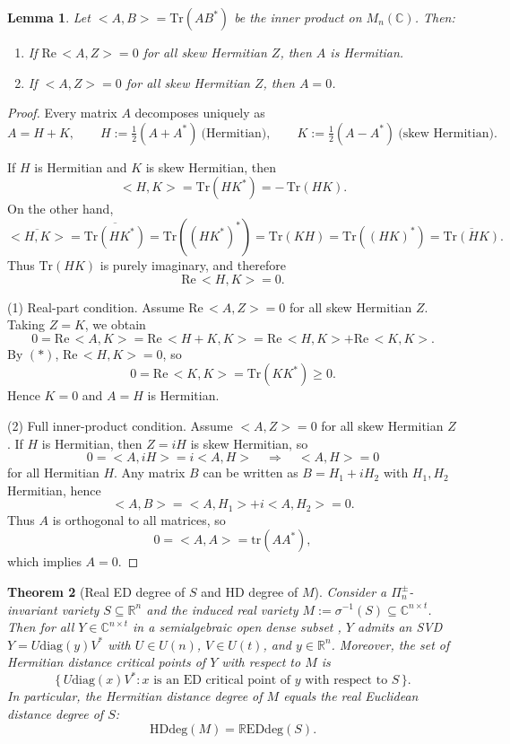 \documentclass[11pt]{amsart}
\def\C{\mathbb C}\let\ce\C
\theoremstyle{plain}
\newtheorem{theorem}{Theorem}
\newtheorem{lemma}[theorem]{Lemma}
\theoremstyle{definition}
\theoremstyle{remark}
\begin{document}
\begin{lemma} \label{skew}
Let $<A,B> = \mathrm{Tr}(A B^{*})$ be the inner product on 
$M_n(\mathbb{C})$. Then:
\begin{enumerate}
\item If $\mathrm{Re}\,<A,Z> = 0$ for all skew Hermitian $Z$, then $A$ is Hermitian.
\item If $<A,Z> = 0$ for all skew Hermitian $Z$, then $A = 0$.
\end{enumerate}
\end{lemma}
\begin{proof}
Every matrix $A$ decomposes uniquely as
\[
A = H + K, \qquad 
H := \tfrac12(A + A^{*})\ \text{(Hermitian)}, \qquad
K := \tfrac12(A - A^{*})\ \text{(skew Hermitian)}.
\]


If $H$ is Hermitian and $K$ is skew Hermitian, then
\[
<H,K> = \mathrm{Tr}(H K^{*}) = -\,\mathrm{Tr}(H K).
\]
On the other hand,
\[
\overline{<H,K>}
= \overline{\mathrm{Tr}(H K^{*})}
= \mathrm{Tr}((H K^{*})^{*})
= \mathrm{Tr}(K H)
= \mathrm{Tr}((H K)^{*})
= \overline{\mathrm{Tr}(H K)}.
\]
Thus $\mathrm{Tr}(H K)$ is purely imaginary, and therefore
\[
\mathrm{Re}\,<H,K> = 0. \tag{$*$}
\]

(1) Real-part condition.
Assume $\mathrm{Re}\,<A,Z> = 0$ for all skew Hermitian $Z$.
Taking $Z = K$, we obtain
\[
0 = \mathrm{Re}\,<A,K>
= \mathrm{Re}\,<H+K,K>
= \mathrm{Re}\,<H,K> + \mathrm{Re}\,<K,K>.
\]
By $(*)$, $\mathrm{Re}\,<H,K>=0$, so
\[
0 = \mathrm{Re}\,<K,K> = \mathrm{Tr}(K K^{*}) \ge 0.
\]
Hence $K = 0$ and $A = H$ is Hermitian.

(2) Full inner-product condition.
Assume $<A,Z> = 0$ for all skew Hermitian $Z$.
If $H$ is Hermitian, then $Z = iH$ is skew Hermitian, so
\[
0 = <A,iH> = i <A,H> \quad\Rightarrow\quad <A,H> = 0
\]
for all Hermitian $H$.  
Any matrix $B$ can be written as $B = H_1 + iH_2$ with $H_1,H_2$ Hermitian, hence
\[
<A,B> = <A,H_1> + i <A,H_2> = 0.
\]
Thus $A$ is orthogonal to all matrices, so
\[
0 = <A,A> = \mathrm{tr}(A A^{*}),
\]
which implies $A = 0$.
\end{proof}


\begin{theorem}[Real ED degree of $S$ and HD degree of $M$]\label{main}
Consider a $\Pi^{\pm}_n$-invariant variety $S \subseteq \mathbb{R}^n$ and the
induced real variety $M := \sigma^{-1}(S) \subseteq \mathbb{C}^{n \times t}$.
Then for all $Y\in\C^{n\times t}$ in a semialgebraic open dense subset ,
$Y$ admits an SVD
$
Y = U\mathrm{diag}(y)V^*
$ with $U \in U(n)$, $V \in U(t)$, and $y \in \mathbb{R}^n$.
Moreover, the set of Hermitian distance critical points of $Y$ with respect to $M$ is
\[
\{\, U \mathrm{diag}(x) V^{*} : x \text{ is an ED critical point of } y 
\text{ with respect to } S \,\}.
\]
In particular, the Hermitian distance degree of $M$ equals the real Euclidean distance
degree of $S$:
\[
\mathrm{HDdeg}(M) = \mathrm{\mathbb{R}EDdeg}(S).
\]
\end{theorem}
\end{document}
